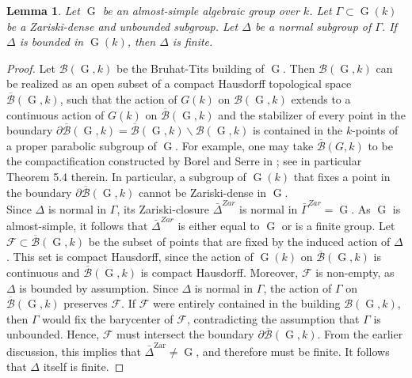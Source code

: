 \documentclass[11pt,letterpaper]{amsart}
\def\cF{\mathcal{F}}
\theoremstyle{plain}
\newtheorem{lem}[thm]{Lemma}
\DeclareMathOperator{\rG}{G}
\begin{document}
\begin{lem}\label{Key_Lemma}
Let $\rG$ be an almost-simple algebraic group over $k$. Let $\Gamma \subset \rG(k)$ be a Zariski-dense and unbounded subgroup. Let $\Delta$ be a normal subgroup of $\Gamma$. If $\Delta$ is bounded in $\rG(k)$, then $\Delta$ is finite.
\end{lem}
\begin{proof}
Let $\mathscr{B}(\rG, k)$ be the Bruhat-Tits building of $\rG$. Then $\mathscr{B}(\rG, k)$ can be realized as an open subset of a compact Hausdorff topological space $\overline{{\mathscr{B}}}(\rG, k)$, such that the action of $G(k)$ on $\mathscr{B}(\rG, k)$ extends to a continuous action of $G(k)$ on $\overline{{\mathscr{B}}}(\rG, k)$ and the stabilizer of every point in the boundary $\partial\overline{{\mathscr{B}}}(\rG, k) = \overline{{\mathscr{B}}}(\rG, k) \backslash \mathscr{B}(\rG, k)$ is contained in the $k$-points of a proper parabolic subgroup of $\rG$. For example, one may take $\overline{\mathscr{B}}(G, k)$ to be the compactification constructed by Borel and Serre in \cite{Borel-Serre}; see in particular Theorem 5.4 therein. In particular, a subgroup of $\rG(k)$ that fixes a point in the boundary $\partial\overline{{\mathscr{B}}}(\rG, k)$ cannot be Zariski-dense in $\rG$.\\

Since $\Delta$ is normal in $\Gamma$, its Zariski-closure $\bar{\Delta}^{Zar}$ is normal in $\bar{\Gamma}^{Zar} = \rG$. As $\rG$ is almost-simple, it follows that $\bar{\Delta}^{Zar}$ is either equal to $\rG$ or is a finite group. Let $\cF \subset \overline{{\mathscr{B}}}(\rG, k)$ be the subset of points that are fixed by the induced action of $\Delta$. This set is compact Hausdorff, since the action of $\rG(k)$ on $\overline{{\mathscr{B}}}(\rG, k)$ is continuous and $\overline{{\mathscr{B}}}(\rG, k)$ is compact Hausdorff. Moreover, $\cF$ is non-empty, as $\Delta$ is bounded by assumption. Since $\Delta$ is normal in $\Gamma$, the action of $\Gamma$ on $\overline{\mathscr{B}}(\rG, k)$ preserves $\cF$. If $\cF$ were entirely contained in the building $\mathscr{B}(\rG, k)$, then $\Gamma$ would fix the barycenter of $\cF$, contradicting the assumption that $\Gamma$ is unbounded. Hence, $\cF$ must intersect the boundary $\partial\overline{\mathscr{B}}(\rG, k)$. From the earlier discussion, this implies that $\bar{\Delta}^{\text{Zar}} \ne \rG$, and therefore must be finite. It follows that $\Delta$ itself is finite.
 \end{proof} 
\end{document}
